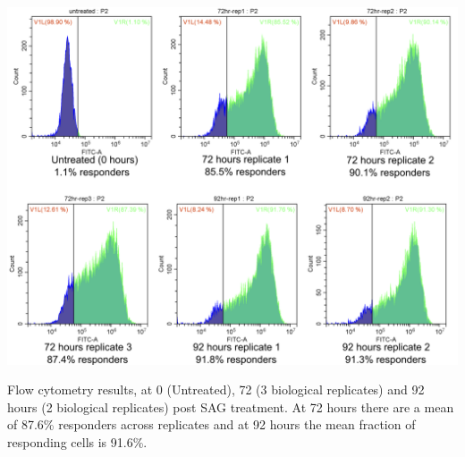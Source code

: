 \begin{suppfigure}[p]  
    \centering
    \includegraphics[width=\linewidth]{figures/hedgehog/SuppFigure2.png}
    \caption[Most cells are responders by 72 hours]{
        Flow cytometry results, at 0 (Untreated), 72 (3 biological replicates) and 92 hours (2 biological replicates) post SAG treatment. At 72 hours there are a mean of 87.6\% responders across replicates and at 92 hours the mean fraction of responding cells is 91.6\%.
    }
    \label{fig:hh_figureS2}
\end{suppfigure}


